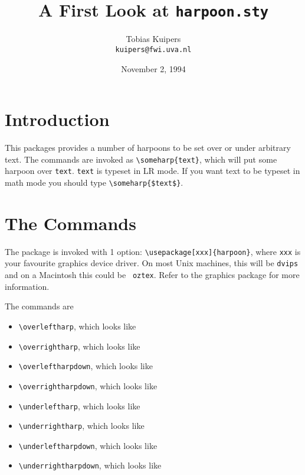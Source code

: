\documentclass[a4paper]{article}
\title{A First Look at {\tt harpoon.sty}}
\author{Tobias Kuipers\\ {\tt kuipers@fwi.uva.nl}}
\date{November 2, 1994}
\begin{document}
\maketitle

\section{Introduction}

This packages provides a number of harpoons to be set over or under
arbitrary text. The commands are invoked as \verb+\someharp{text}+,
which will put some harpoon over {\tt text}. {\tt text} is typeset in LR
mode. If you want text to be typeset in math mode you should type
\verb+\someharp{$text$}+. 

\section{The Commands}

The package is invoked with 1 option: \verb+\usepackage[xxx]{harpoon}+,
where {\tt xxx} is your favourite graphics device driver. On most Unix
machines, this will be {\tt dvips} and on a Macintosh this could be {\tt
oztex}. Refer to the graphics package for more information.

The commands are
\begin{itemize}
	\item \verb+\overleftharp+, which looks like 
	\item \verb+\overrightharp+, which looks like 
	\item \verb+\overleftharpdown+, which looks like 
	\item \verb+\overrightharpdown+, which looks like 
	\item \verb+\underleftharp+, which looks like 
	\item \verb+\underrightharp+, which looks like 
	\item \verb+\underleftharpdown+, which looks like 
	\item \verb+\underrightharpdown+, which looks like 
\end{itemize}
\end{document}
